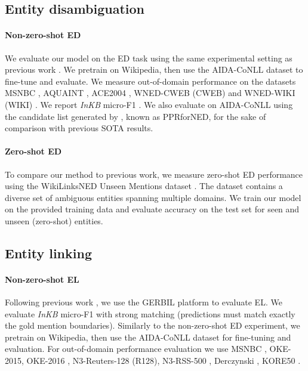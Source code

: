 \documentclass[11pt]{article}
\begin{document}
\subsection{Entity disambiguation}
\paragraph{Non-zero-shot ED} \label{ed_setup}
We evaluate our model on the ED task using the same experimental setting as previous work \citep{ganea-hofmann-2017-deep, le-titov-2018-improving, Cao2020AutoregressiveER}. We pretrain on Wikipedia, then use the AIDA-CoNLL dataset \citep{hoffart-etal-2011-robust} to fine-tune and evaluate. We measure out-of-domain performance on the datasets MSNBC \citep{msnbc}, AQUAINT \citep{aquaint}, ACE2004 \citep{ace2004}, WNED-CWEB (CWEB) \citep{cweb} and WNED-WIKI (WIKI) \citep{wned}. 
We report \emph{InKB} micro-F1 \cite{gerbil}. We also evaluate on AIDA-CoNLL using the candidate list generated by \citet{pershina-etal-2015-personalized}, known as PPRforNED, for the sake of comparison with previous SOTA results.





\paragraph{Zero-shot ED}
To compare our method to previous work, we measure zero-shot ED performance using the WikiLinksNED Unseen Mentions dataset \citep{wikilinksned, DBLP:conf/aaai/OnoeD20}. The dataset contains a diverse set of ambiguous entities spanning multiple domains. We train our model on the provided training data and evaluate accuracy on the test set for seen and unseen (zero-shot) entities.













\subsection{Entity linking}
\paragraph{Non-zero-shot EL}
Following previous work \citep{kolitsas-etal-2018-end, Cao2020AutoregressiveER}, we use the GERBIL platform \citep{gerbil} to evaluate EL. We evaluate \emph{InKB} micro-F1 with strong matching (predictions must match exactly the gold mention boundaries). Similarly to the non-zero-shot ED experiment, we pretrain on Wikipedia, then use the AIDA-CoNLL dataset for fine-tuning and evaluation. For out-of-domain performance evaluation we use MSNBC \citep{msnbc}, OKE-2015, OKE-2016 \citep{oke}, N3-Reuters-128 (R128), N3-RSS-500 \citep{rss500}, Derczynski \citep{derczynski}, KORE50 \citep{KORE50}.
\end{document}
